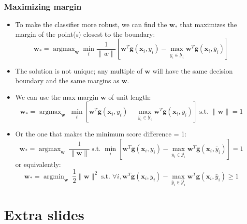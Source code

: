 \documentclass[ignorenonframetext,plain]{beamer}
\DeclareMathOperator*{\argmax}{argmax}
\DeclareMathOperator*{\argmin}{argmin}
\renewcommand{\vec}{\mathbf}
\begin{document}
\begin{frame}\frametitle{Maximizing margin}
\begin{itemize}
\item To make the classifier more robust, we can find the $\vec{w}_*$
  that maximizes the margin of the point(s) closest to the boundary: \[
  \vec{w}_* = \argmax_\vec{w} \min_i \frac{1}{\|w\|}
  \left[ \vec{w}^T\vec{g}(\vec{x}_i,y_i) - \max_{\bar{y}_i \in 
    \bar{\mathcal{Y}_i}} \vec{w}^T\vec{g}(\vec{x}_i,\bar{y}_i) \right]
\]
\item The solution is not unique; any multiple of $\vec{w}$ will have
  the same decision boundary and the same margins as $\vec{w}$.
\item We can use the max-margin $\vec{w}$ of unit length: \[
\vec{w}_* = \argmax_\vec{w}\; \min_i \left[ \vec{w}^T\vec{g}(\vec{x}_i,y_i) - \max_{\bar{y}_i \in 
    \bar{\mathcal{Y}_i}} \vec{w}^T\vec{g}(\vec{x}_i,\bar{y}_i) \right]
\;\text{s.t. } \|\vec{w}\|=1
\]
\item Or the one that makes the minimum score difference = 1: \[
\vec{w}_* = \argmax_\vec{w}\; \frac{1}{\|\vec{w}\|}
\;\text{s.t. } \min_i \left[ \vec{w}^T\vec{g}(\vec{x}_i,y_i) - \max_{\bar{y}_i \in 
    \bar{\mathcal{Y}_i}} \vec{w}^T\vec{g}(\vec{x}_i,\bar{y}_i) \right]
= 1
\]
or equivalently: \[
\vec{w}_* = \argmin_\vec{w}\; \frac{1}{2} \|\vec{w}\|^2
\;\text{s.t. } \forall i, \vec{w}^T\vec{g}(\vec{x}_i,y_i) - \max_{\bar{y}_i \in 
    \bar{\mathcal{Y}_i}} \vec{w}^T\vec{g}(\vec{x}_i,\bar{y}_i) \geq 1
\]
\end{itemize}
\end{frame}

\section{Extra slides}
\frame{\sectionpage}
\end{document}
